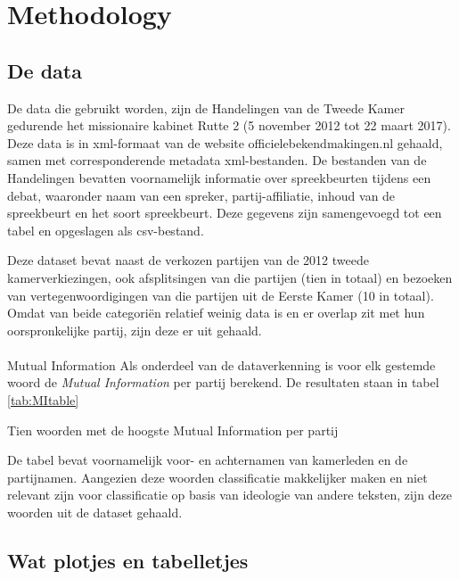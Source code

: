 \section{Methodology}
\label{sec:meth}


\subsection{De data}
De data die gebruikt worden, zijn de Handelingen van de Tweede Kamer gedurende het missionaire kabinet Rutte 2 (5 november 2012 tot 22 maart 2017). Deze data is in xml-formaat van de website officielebekendmakingen.nl gehaald, samen met corresponderende metadata xml-bestanden. De bestanden van de Handelingen bevatten voornamelijk informatie over spreekbeurten tijdens een debat, waaronder naam van een spreker, partij-affiliatie, inhoud van de spreekbeurt en het soort spreekbeurt. Deze gegevens zijn samengevoegd tot een tabel en opgeslagen als csv-bestand.\par
Deze dataset bevat naast de verkozen partijen van de 2012 tweede kamerverkiezingen, ook afsplitsingen van die partijen (tien in totaal) en bezoeken van vertegenwoordigingen van die partijen uit de Eerste Kamer (10 in totaal). Omdat van beide categori\"{e}n relatief weinig data is en er overlap zit met hun oorspronkelijke partij, zijn deze er uit gehaald.
\begin{table}[H]
\centering

\end{table}

\paragraph{}{Mutual Information}
Als onderdeel van de dataverkenning is voor elk gestemde woord de \textit{Mutual Information} per partij berekend. De resultaten staan in tabel \ref{tab:MItable}
\begin{table}[H]
\caption{Tien woorden met de hoogste Mutual Information per partij}
\label{tab:MItable}
\centering

\end{table}
De tabel bevat voornamelijk voor- en achternamen van kamerleden en de partijnamen. Aangezien deze woorden classificatie makkelijker maken en niet relevant zijn voor classificatie op basis van ideologie van andere teksten, zijn deze woorden uit de dataset gehaald.
\pagebreak
\subsection{Wat plotjes en tabelletjes}

